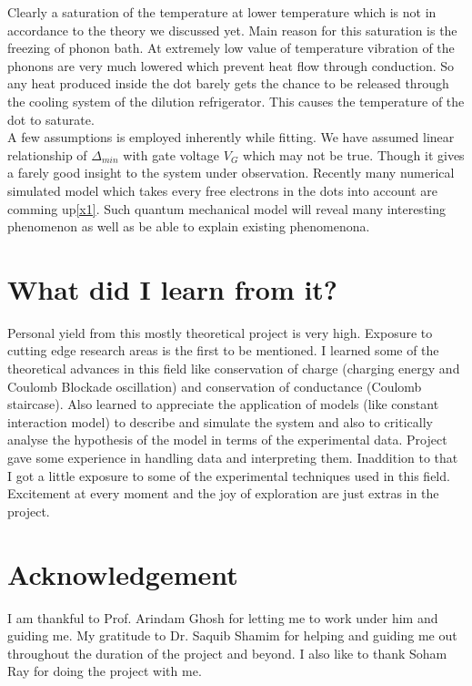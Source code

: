 \documentclass[a4paper]{report}
\begin{document}
    Clearly a saturation of the temperature at lower temperature which is not in accordance to the theory we discussed yet. Main reason for this saturation is the freezing of phonon bath. At extremely low value of temperature vibration of the phonons are very much lowered which prevent heat flow through conduction. So any heat produced inside the dot barely gets the chance to be released through the cooling system of the dilution refrigerator. This causes the temperature of the dot to saturate. \\
    A few assumptions is employed inherently while fitting. We have assumed linear relationship of $\Delta_{min} $ with gate voltage $V_{G}$ which may not be true. Though it gives a farely good insight to the system under observation. Recently many numerical simulated model which takes  every free electrons in the dots into account are comming up\ref{x1}. Such quantum mechanical model will reveal many interesting phenomenon as well as be able to explain existing phenomenona. 

  \section*{What did I learn from it?}
    \hspace{10pt} Personal yield from this mostly theoretical project is very high. Exposure
    to cutting edge research areas is the first to be mentioned. I learned some
    of the theoretical advances in this field like conservation of charge (charging
    energy and Coulomb Blockade oscillation) and conservation of conductance
    (Coulomb staircase). Also learned to appreciate the application of models (like
    constant interaction model) to describe and simulate the system and also to
    critically analyse the hypothesis of the model in terms of the experimental data.
    Project gave some experience in handling data and interpreting them. Inaddition to that I got a little exposure to some of the experimental techniques
    used in this field. Excitement at every moment and the joy of exploration are
    just extras in the project.

  \section*{Acknowledgement}
    \hspace{10pt} I am thankful to Prof. Arindam Ghosh for letting me to work under him and guiding me. My gratitude to Dr. Saquib Shamim for helping and guiding me out throughout the duration of the project and beyond. I also like to thank Soham Ray for doing the project with me.
\end{document}
